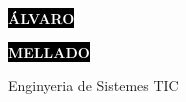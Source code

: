 \documentclass[9pt]{developercv} %
\begin{document}

\begin{minipage}[t]{0.45\textwidth} %
	\vspace{-\baselineskip} %
	
	\colorbox{black}{{\HUGE\textcolor{white}{\textbf{\MakeUppercase{Álvaro}}}}} %
	
	\colorbox{black}{{\HUGE\textcolor{white}{\textbf{\MakeUppercase{Mellado}}}}} %
	
	\vspace{6pt}
	
	{\huge Enginyeria de Sistemes TIC} %
\end{minipage}
\begin{minipage}[t]{0.275\textwidth} %
	\vspace{-\baselineskip} %
	
	\\
	\\
	\\	
\end{minipage}
\begin{minipage}[t]{0.275\textwidth} %
	\vspace{-\baselineskip} %
	

\end{minipage}
\end{document}
